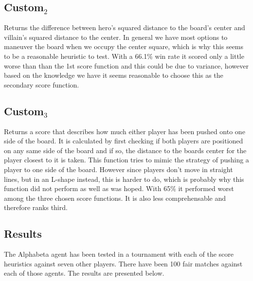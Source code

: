 \documentclass{article}
\begin{document}
\subsection{Custom$_2$}
Returns the difference between hero's squared distance to the board's center and villain's
squared distance to the center. In general we have most options to maneuver the board when
we occupy the center square, which is why this seems to be a reasonable heuristic to test.
With a 66.1\% win rate it scored only a little worse than than the 1st score function and this could be due to
variance, however based on the knowledge we have it seems reasonable to choose this as
the secondary score function.

\subsection{Custom$_3$}
Returns a score that describes how much either player has been pushed onto one side of the
board. It is calculated by first checking if both players are positioned on any same side
of the board and if so, the distance to the boards center for the player closest to it is
taken. This function tries to mimic the strategy of pushing a player to one side of the board.
However since players don't move in straight lines, but in an L-shape instead, this is harder
to do, which is probably why this function did not perform as well as was hoped. With 65\% it
performed worst among the three chosen score functions. It is also less comprehensable and
therefore ranks third.

\subsection{Results}
The Alphabeta agent has been tested in a tournament with each of the score heuristics
against seven other players. There have been 100 fair matches against each of those
agents. The results are presented below.
\end{document}
